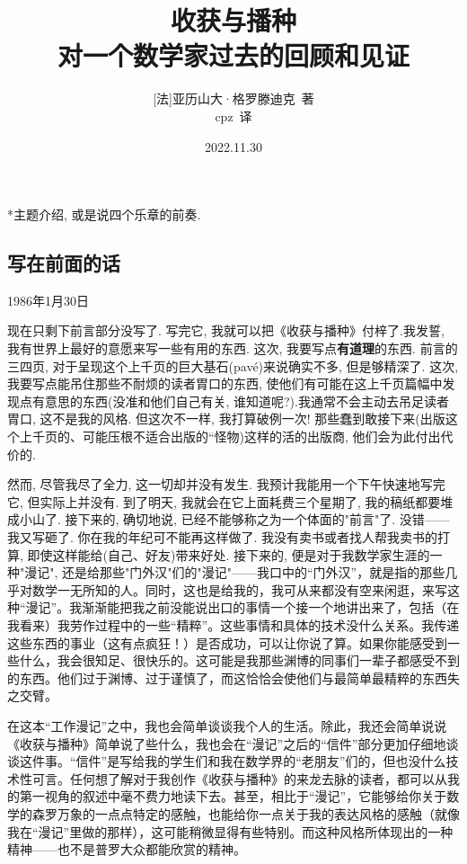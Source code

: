 \documentclass[UTF8, b5paper]{book}
\title{收获与播种\\对一个数学家过去的回顾和见证}
\author{[法]亚历山大·格罗滕迪克\ 著\\cpz\ 译}
\date{2022.11.30}
\begin{document}
\maketitle
\tableofcontents

\chapter*{}*{主题介绍, 或是说四个乐章的前奏.}
\section{写在前面的话}
1986年1月30日 \par
现在只剩下前言部分没写了. 写完它, 我就可以把《收获与播种》付梓了.我发誓, 我有世界上最好的意愿来写一些有用的东西.%
这次, 我要写点\textbf{有道理}的东西. %
前言的三四页, 对于呈现这个上千页的巨大基石(pavé)来说确实不多, 但是够精深了.
这次, 我要写点能吊住那些不耐烦的读者胃口的东西, 使他们有可能在这上千页篇幅中发现点有意思的东西(没准和他们自己有关, 谁知道呢?).我通常不会主动去吊足读者胃口, 这不是我的风格. 但这次不一样, 我打算破例一次! 那些蠢到敢接下来(出版这个上千页的、可能压根不适合出版的“怪物)这样的活的出版商, 他们会为此付出代价的. \par
然而, 尽管我尽了全力, 这一切却并没有发生. 我预计我能用一个下午快速地写完它, 但实际上并没有. 到了明天, 我就会在它上面耗费三个星期了, 我的稿纸都要堆成小山了. 接下来的, 确切地说, 已经不能够称之为一个体面的"前言"了. 没错——我又写砸了. 你在我的年纪可不能再这样做了. 我没有卖书或者找人帮我卖书的打算, 即使这样能给(自己、好友)带来好处.
接下来的, 便是对于我数学家生涯的一种"漫记", 还是给那些"门外汉"们的"漫记"——我口中的“门外汉”，就是指的那些几乎对数学一无所知的人。同时，这也是给我的，我可从来都没有空来闲逛，来写这种“漫记”。我渐渐能把我之前没能说出口的事情一个接一个地讲出来了，包括（在我看来）我劳作过程中的一些“精粹”。这些事情和具体的技术没什么关系。我传递这些东西的事业（这有点疯狂！）是否成功，可以让你说了算。如果你能感受到一些什么，我会很知足、很快乐的。这可能是我那些渊博的同事们一辈子都感受不到的东西。他们过于渊博、过于谨慎了，而这恰恰会使他们与最简单最精粹的东西失之交臂。\par
在这本“工作漫记”之中，我也会简单谈谈我个人的生活。除此，我还会简单说说《收获与播种》简单说了些什么，我也会在“漫记”之后的“信件”部分更加仔细地谈谈这件事。“信件”是写给我的学生们和我在数学界的“老朋友”们的，但也没什么技术性可言。任何想了解对于我创作《收获与播种》的来龙去脉的读者，都可以从我的第一视角的叙述中毫不费力地读下去。甚至，相比于“漫记”，它能够给你关于数学的森罗万象的一点点特定的感触，也能给你一点关于我的表达风格的感触（就像我在“漫记”里做的那样），这可能稍微显得有些特别。而这种风格所体现出的一种精神——也不是普罗大众都能欣赏的精神。\par
\end{document}
